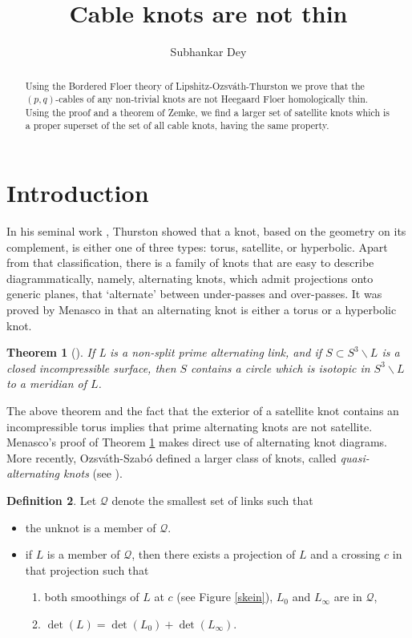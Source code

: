 \documentclass[11pt,reqno]{amsart}
\title{Cable knots are not thin}
\author{Subhankar Dey}
\date{}
\newtheorem {theorem}{Theorem}
\theoremstyle{definition}
\newtheorem {definition}[theorem]{Definition}
\newtheorem *{remark}{Remark}
\begin{document}
\maketitle

\begin{abstract}
Using the Bordered Floer theory of Lipshitz-Ozsv\'ath-Thurston we prove that the $(p,q)$-cables of any non-trivial knots are not Heegaard Floer homologically thin. Using the proof and a theorem of Zemke, we find a larger set of satellite knots which is a proper superset of the set of all cable knots, having the same property.
\end{abstract}

\section{Introduction} 
  In his seminal work \cite{thurston82, thurston86}, Thurston showed that a knot, based on the geometry on its complement, is either one of three types: torus, satellite, or hyperbolic. Apart from that classification, there is a family of knots that are easy to describe diagrammatically, namely, alternating knots, which admit projections onto generic planes, that `alternate' between under-passes and over-passes. It was proved by Menasco in \cite{menasco84} that an alternating knot is either a torus or a hyperbolic knot.
\begin{theorem}[\cite{menasco84}] 
\label{thm:mer_lemma}
If L is a non-split prime alternating link, and if $S \subset S^3 \smallsetminus L$ is a closed incompressible surface, then $S$ contains a circle which is isotopic in $S^3 \smallsetminus L$ to a meridian of $L$.
\end{theorem}
The above theorem and the fact that the exterior of a satellite knot contains an incompressible torus implies that prime alternating knots are not satellite. Menasco's proof of Theorem \ref{thm:mer_lemma} makes direct use of alternating knot diagrams. More recently, Ozsv\'ath-Szab\'o defined a larger class of knots, called \emph{quasi-alternating knots} (see \cite[Definition 3.1]{osbranch05}).
\begin{definition} Let $\mathcal{Q}$ denote the smallest set of links such that 
 \begin{itemize}
     \item the unknot is a member of $\mathcal{Q}$. 
     \item if $L$ is a member of $\mathcal{Q}$, then there exists a projection of $L$ and a crossing $c$ in that projection such that 
     \begin{enumerate}
     \item both smoothings of $L$ at $c$ (see Figure \ref{skein}), $L_0$ and $L_{\infty}$ are in $\mathcal{Q}$,
     \item $\det(L) = \det(L_0) + \det(L_{\infty})$.
     \end{enumerate}
 \end{itemize}
 \end{definition}
 
\end{document}
